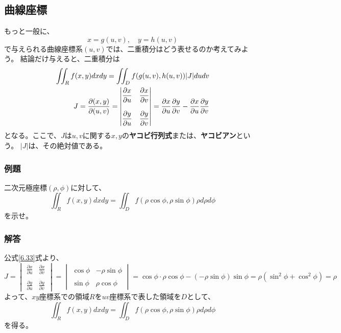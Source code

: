 \documentclass[a4j,dvipdfmx]{jsarticle}
\begin{document}
\subsection{曲線座標}
もっと一般に、
\begin{equation*}
    x=g(u,v),\quad y=h(u,v)
\end{equation*}
で与えられる曲線座標系$(u,v)$では、二重積分はどう表せるのか考えてみよう。
結論だけ与えると、二重積分は
\begin{align}
    \iint_R f(x,y)dxdy=\iint_D f(g(u,v),h(u,v))|J|du dv\notag\\
    J=\frac{\partial(x,y)}{\partial(u,v)}=
    \begin{vmatrix}
        \displaystyle\frac{\partial x}{\partial u} & \displaystyle\frac{\partial x}{\partial v}\\
        &\\
        \displaystyle\frac{\partial y}{\partial u} & \displaystyle\frac{\partial y}{\partial v}
    \end{vmatrix}
    =\frac{\partial x}{\partial u}\frac{\partial y}{\partial v}-\frac{\partial x}{\partial u}\frac{\partial y}{\partial v}\label{6.33}
\end{align}
となる。ここで、$J$は$u,v$に関する$x,y$の\textbf{ヤコビ行列式}または、\textbf{ヤコビアン}という。
$|J|$は、その絶対値である。

\subsubsection*{例題}
二次元極座標$(\rho,\phi)$に対して、
\begin{equation*}
    \iint_R f(x,y)dxdy=\iint_Df(\rho\cos\phi,\rho\sin\phi)\rho d\rho d\phi
\end{equation*}
を示せ。

\subsubsection*{解答}
公式\eqref{6.33}式より、
\begin{equation*}
    J=\begin{vmatrix}
        \displaystyle\frac{\partial x}{\partial u} & \displaystyle\frac{\partial x}{\partial v}\\
        &\\
        \displaystyle\frac{\partial y}{\partial u} & \displaystyle\frac{\partial y}{\partial v}
    \end{vmatrix}
    =\begin{vmatrix}
        \cos\phi & -\rho\sin\phi\\
        &\\
        \sin\phi & \rho\cos\phi
    \end{vmatrix}
    =\cos\phi\cdot\rho\cos\phi - (-\rho\sin\phi)\sin\phi=\rho(\sin^2\phi+\cos^2\phi)=\rho
\end{equation*}
よって、$xy$座標系での領域$R$を$uv$座標系で表した領域を$D$として、
\begin{equation*}
    \iint_R f(x,y)dxdy=\iint_Df(\rho\cos\phi,\rho\sin\phi)\rho d\rho d\phi
\end{equation*}
を得る。
\end{document}
